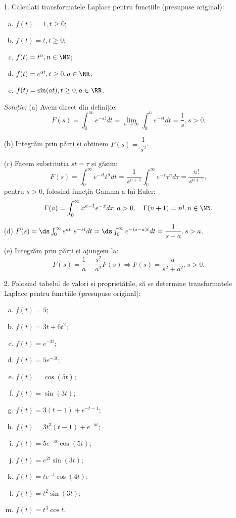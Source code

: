 1. Calculați transformatele Laplace pentru funcțiile (presupuse original):
\begin{enumerate}[(a)]
    \item $ f(t) = 1, t \geq 0 $;
    \item $ f(t) = t, t \geq 0 $;
    \item $ f(t) = t^n, n \in \NN $;
    \item $ f(t) = e^{at}, t \geq 0, a \in \RR $;
    \item $ f(t) = \sin(at), t \geq 0, a \in \RR $.
\end{enumerate}

\emph{Soluție:} (a) Avem direct din definiție:
\[
    F(s) = \int_0^\infty e^{-st} dt = \lim_{n \to \infty} \int_0^n e^{-st} dt = \frac{1}{s}, s > 0.
\]

(b) Integrăm prin părți și obținem $ F(s) = \dfrac{1}{s^2} $.

(c) Facem substituția $ st = \tau $ și găsim:
\[
    F(s) = \int_0^\infty e^{-st} t^n dt = \frac{1}{s^{n+1}} \int_0^\infty e^{-\tau} \tau^n d\tau = %
    \frac{n!}{s^{n+1}},
\]
pentru $ s > 0 $, folosind funcția Gamma a lui Euler:
\[
    \Gamma(a) = \int_0^\infty x^{a-1}e^{-x} dx, a > 0, \quad \Gamma(n + 1) = n!, n \in \NN.
\]

(d) $ F(s) = \ds\int_0^\infty e^{at} e^{-st} dt = \ds\int_0^\infty e^{-(s - a)t} dt = %
\dfrac{1}{s-a}, s > a $.

(e) Integrăm prin părți și ajungem la:
\[
    F(s) = \frac{1}{a} - \frac{s^2}{a^2} F(s) \Rightarrow F(s) = \frac{a}{s^2 + a^2}, s > 0.
\]

\vspace{0.3cm}

2. Folosind tabelul de valori și proprietățile, să se determine transformatele Laplace
pentru funcțiile (presupuse original):
\begin{enumerate}[(a)]
    \item $ f(t) = 5 $;
    \item $ f(t) = 3t + 6t^2 $;
    \item $ f(t) = e^{-3t} $;
    \item $ f(t) = 5e^{-3t} $;
    \item $ f(t) = \cos (5t) $;
    \item $ f(t) = \sin (3t) $;
    \item $ f(t) = 3(t-1) + e^{-t-1} $;
    \item $ f(t) = 3t^3(t - 1) + e^{-5t} $;
    \item $ f(t) = 5e^{-3t} \cos (5t) $;
    \item $ f(t) = e^{2t} \sin (3t) $;
    \item $ f(t) = te^{-t} \cos (4t) $;
    \item $ f(t) = t^2 \sin (3t) $;
    \item $ f(t) = t^3 \cos t $.
\end{enumerate}

